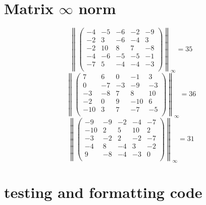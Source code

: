 \documentclass{article}
\begin{document}
\section{Matrix $\infty$ norm}
	
	$$ \left\| \begin{pmatrix}-4 & -5 & -6 & -2 & -9 \\-2 & 3 & -6 & -4 & 3 \\-2 & 10 & 8 & 7 & -8 \\-4 & -6 & -5 & -5 & -1 \\-7 & 5 & -4 & -4 & -3 \\\end{pmatrix}\right\|_{\infty} = 35$$
	$$ \left\| \begin{pmatrix}7 & 6 & 0 & -1 & 3 \\0 & -7 & -3 & -9 & -3 \\-3 & -8 & 7 & 8 & 10 \\-2 & 0 & 9 & -10 & 6 \\-10 & 3 & 7 & -7 & -5 \\\end{pmatrix}\right\|_{\infty} = 36$$
	$$ \left\| \begin{pmatrix}-9 & -9 & -2 & -4 & -7 \\-10 & 2 & 5 & 10 & 2 \\-3 & -2 & 2 & -2 & -7 \\-4 & 8 & -4 & 3 & -2 \\9 & -8 & -4 & -3 & 0 \\\end{pmatrix}\right\|_{\infty} = 31$$

\section{testing and formatting code}
	
\end{document}
